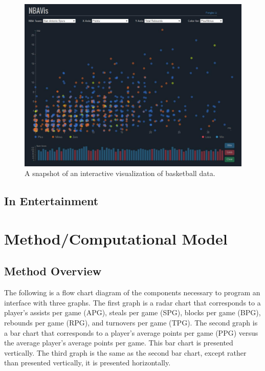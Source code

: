 \documentclass[journal]{vgtc}                %
\begin{document}
\begin{figure}[h]
\caption{A snapshot of an interactive visualization of basketball data.}
\includegraphics[width=\linewidth]{georgiatech.jpg}
\end{figure}
\subsection{In Entertainment}



\section{Method/Computational Model}
\subsection{Method Overview}
The following is a flow chart diagram of the components necessary to program an interface with three graphs. The first graph is a radar chart that corresponds to a player's assists per game (APG), steals per game (SPG), blocks per game (BPG), rebounds per game (RPG), and turnovers per game (TPG). The second graph is a bar chart that corresponds to a player's average points per game (PPG) versus the average player's average points per game. This bar chart is presented vertically. The third graph is the same as the second bar chart, except rather than presented vertically, it is presented horizontally. 

\end{document}
